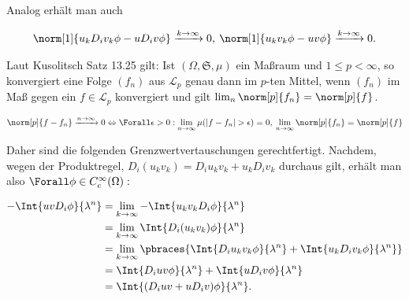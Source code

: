 \begin{solution}
Analog erhält man auch

\begin{align*}
  \norm[1]{u_k D_i v_k \phi - u D_i v \phi}
  \xrightarrow{k \to \infty} 0, \:
  \norm[1]{u_k v_k \phi - uv \phi}
  \xrightarrow{k \to \infty} 0.
\end{align*}

Laut Kusolitsch Satz 13.25 gilt: Ist $(\Omega, \mathfrak{S}, \mu)$ ein Maßraum und $1 \leq p < \infty$, so konvergiert eine Folge $(f_n)$ aus $\mathcal{L}_p$ genau dann im $p$-ten Mittel, wenn $(f_n)$ im Maß gegen ein $f \in \mathcal{L}_p$ konvergiert und gilt $\lim_n \norm[p]{f_n} = \norm[p]{f}$.

\begin{align*}
  \norm[p]{f - f_n}
  \xrightarrow{n \to \infty} 0
  \Leftrightarrow
  \Forall \epsilon > 0:
  \lim_{n \to \infty} \mu(|f - f_n| > \epsilon) = 0, \:
  \lim_{n \to \infty} \norm[p]{f_n} = \norm[p]{f}
\end{align*}

Daher sind die folgenden Grenzwertvertauschungen gerechtfertigt. Nachdem, wegen der Produktregel, $D_i(u_k v_k) = D_i u_k v_k + u_k D_i v_k$ durchaus gilt, erhält man also $\Forall \phi \in C_c^\infty(\Omega):$

\begin{align*}
  - \Int{uv D_i \phi}{\lambda^n}
  & = \lim_{k \to \infty} - \Int{u_k v_k D_i \phi}{\lambda^n} \\
  & = \lim_{k \to \infty} \Int{D_i(u_k v_k) \phi}{\lambda^n} \\
  & = \lim_{k \to \infty}
      \pbraces
      {
        \Int{D_i u_k v_k \phi}{\lambda^n} +
        \Int{u_k D_i v_k \phi}{\lambda^n}
      } \\
  & = \Int{D_i u v \phi}{\lambda^n} +
      \Int{u D_i v \phi}{\lambda^n} \\
  & = \Int{(D_i u v + u D_i v) \phi}{\lambda^n}.
\end{align*}

\end{solution}


